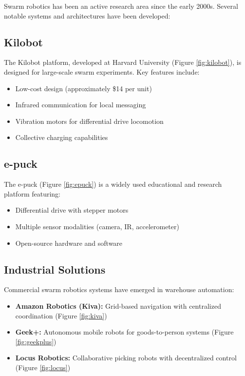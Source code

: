 Swarm robotics has been an active research area since the early 2000s. Several notable systems and architectures have been developed:

\subsection{Kilobot}
The Kilobot platform, developed at Harvard University \cite{rubenstein2012kilobot} (Figure \ref{fig:kilobot}), is designed for large-scale swarm experiments. Key features include:
\begin{itemize}
    \item Low-cost design (approximately \$14 per unit)
    \item Infrared communication for local messaging
    \item Vibration motors for differential drive locomotion
    \item Collective charging capabilities
\end{itemize}

\subsection{e-puck}
The e-puck \cite{mondada2009puck} (Figure \ref{fig:epuck}) is a widely used educational and research platform featuring:
\begin{itemize}
    \item Differential drive with stepper motors
    \item Multiple sensor modalities (camera, IR, accelerometer)
    \item Open-source hardware and software
\end{itemize}

\subsection{Industrial Solutions}
Commercial swarm robotics systems have emerged in warehouse automation:
\begin{itemize}
    \item \textbf{Amazon Robotics (Kiva):} Grid-based navigation with centralized coordination (Figure \ref{fig:kiva})
    \item \textbf{Geek+:} Autonomous mobile robots for goods-to-person systems (Figure \ref{fig:geekplus})
    \item \textbf{Locus Robotics:} Collaborative picking robots with decentralized control (Figure \ref{fig:locus})
\end{itemize}

